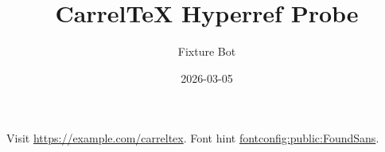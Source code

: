 \documentclass{article}
\title{CarrelTeX Hyperref Probe}
\author{Fixture Bot}
\date{2026-03-05}
\begin{document}
\maketitle

Visit \url{https://example.com/carreltex}.
Font hint \url{fontconfig:public:FoundSans}.
\end{document}
